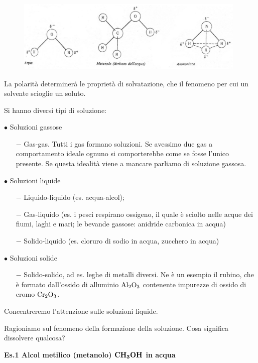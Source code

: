 \begin{figure}[htp]
    \centering
    \includegraphics[width=11cm]{immagini/molecole_polari}
\end{figure}

La polarità determinerà le proprietà di solvatazione, che il fenomeno per cui un solvente scioglie un soluto.

\vspace{0.2cm}Si hanno diversi tipi di soluzione:

\vspace{0.2cm}$\bullet$ Soluzioni gassose
\begin{itemize}
    \item[$-$]Gas-gas. Tutti i gas formano soluzioni. Se avessimo due gas a comportamento ideale ognuno si comporterebbe come se fosse l'unico presente. Se questa idealità viene a mancare parliamo di soluzione gassosa.
\end{itemize}

$\bullet$ Soluzioni liquide
\begin{itemize}
    \item[$-$]Liquido-liquido (es. acqua-alcol);
    \item[$-$]Gas-liquido (es. i pesci respirano ossigeno, il quale è sciolto nelle acque dei fiumi, laghi e mari; le bevande gassose: anidride carbonica in acqua)
    \item[$-$]Solido-liquido (es. cloruro di sodio in acqua, zucchero in acqua) 
\end{itemize}
\vspace{0.2cm}$\bullet$ Soluzioni solide
\begin{itemize}
    \item[$-$]Solido-solido, ad es. leghe di metalli diversi. Ne è un esempio il rubino, che è formato dall'ossido di alluminio $\rm Al_2O_3$ contenente impurezze di ossido di cromo $\rm Cr_2O_3$.
\end{itemize}
Concentreremo l'attenzione sulle soluzioni liquide.

Ragioniamo sul fenomeno della formazione della soluzione. Cosa significa dissolvere qualcosa?

\vspace{0.2cm}\textbf{Es.1 Alcol metilico (metanolo) $\boldsymbol{\rm CH_3OH}$ in acqua}

